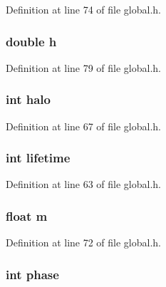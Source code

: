Definition at line 74 of file global.\-h.

\hypertarget{structcellData_a8ee9be1b5aa75abae556de3088cba6d9}{
\subsubsection[{h}]{\setlength{\rightskip}{0pt plus 5cm}double h}}\label{structcellData_a8ee9be1b5aa75abae556de3088cba6d9}


Definition at line 79 of file global.\-h.

\hypertarget{structcellData_a80ff3fcc4d03d0b1b01559839d12df5b}{
\subsubsection[{halo}]{\setlength{\rightskip}{0pt plus 5cm}int halo}}\label{structcellData_a80ff3fcc4d03d0b1b01559839d12df5b}


Definition at line 67 of file global.\-h.

\hypertarget{structcellData_ada4af333b662b0bba80e2f5e273fe4ea}{
\subsubsection[{lifetime}]{\setlength{\rightskip}{0pt plus 5cm}int lifetime}}\label{structcellData_ada4af333b662b0bba80e2f5e273fe4ea}


Definition at line 63 of file global.\-h.

\hypertarget{structcellData_ac51334f57ef8b81c0629c9421798c344}{
\subsubsection[{m}]{\setlength{\rightskip}{0pt plus 5cm}float m}}\label{structcellData_ac51334f57ef8b81c0629c9421798c344}


Definition at line 72 of file global.\-h.

\hypertarget{structcellData_accf3aec63bc20b3c99ab4881cb07c05b}{
\subsubsection[{phase}]{\setlength{\rightskip}{0pt plus 5cm}int phase}}\label{structcellData_accf3aec63bc20b3c99ab4881cb07c05b}


